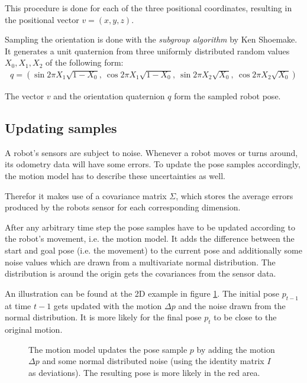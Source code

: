 \documentclass[Thesis.tex]{subfiles}
\begin{document}
This procedure is done for each of the three positional coordinates, resulting in the positional vector $v = \left(x, y, z\right)$.

Sampling the orientation is done with the \emph{subgroup algorithm} by Ken Shoemake\cite[p.~129-130]{gfxgems:1995}. It generates a unit quaternion from three uniformly distributed random values $X_0, X_1, X_2$ of the following form:
\begin{align}
q = \left( \sin{2\pi X_1}\sqrt{1-X_0},\: \cos{2\pi X_1}\sqrt{1-X_0},\: 
           \sin{2\pi X_2}\sqrt{  X_0},\: \cos{2\pi X_2}\sqrt{  X_0} \right)
\end{align}


The vector $v$ and the orientation quaternion $q$ form the sampled robot pose.

\subsection{Updating samples}

A robot's sensors are subject to noise. Whenever a robot moves or turns around, its odometry data will have some errors.
To update the pose samples accordingly, the motion model has to describe these uncertainties as well.

Therefor it makes use of a covariance matrix $\Sigma$, which stores the average errors produced by the robots sensor for each corresponding dimension.


After any arbitrary time step the pose samples have to be updated according to the robot's movement, i.e. the motion model. It adds the difference between the start and goal pose (i.e. the movement) to the current pose and additionally some noise values which are drawn from a multivariate normal distribution. The distribution is around the origin gets the covariances from the sensor data. 

An illustration can be found at the 2D example in figure \ref{fig:2d_noise_sampling}. The initial pose $p_{t-1}$ at time $t-1$ gets updated with the motion $\Delta p$ and the noise drawn from the normal distribution. It is more likely for the final pose $p_t$ to be close to the original motion.
\begin{figure}
  \caption{The motion model updates the pose sample $p$ by adding the motion $\Delta p$ and some normal distributed noise (using the identity matrix $I$ as deviations). The resulting pose is more likely in the red area.}
  \label{fig:2d_noise_sampling}
\end{figure}
\end{document}
